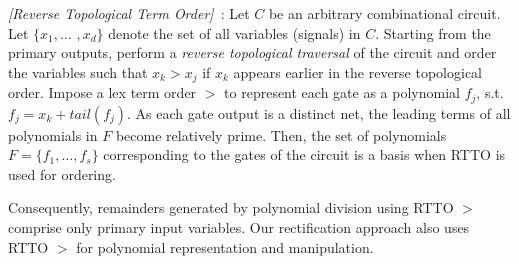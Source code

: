 \begin{Definition}\label{def:rtto}
{\it  [Reverse Topological Term Order]}~\cite{lv:tcad2013}:
Let $C$ be an arbitrary combinational
circuit. Let $\{x_1, \dots$ $, x_d\}$ denote the set of all variables
(signals) in $C$. Starting from the primary outputs, perform
a {\it reverse topological traversal} of the circuit and order the
variables such that $x_k > x_j$ if $x_k$ appears earlier in the
reverse topological order. Impose a lex term order $>$ to represent each
gate as a polynomial $f_j$, s.t. $f_j = x_k + tail(f_j)$. 
As each gate output is a distinct net, the
leading terms of all polynomials in $F$ become relatively prime.
Then, the set of polynomials $F=\{f_1,\dots,f_s\}$ corresponding to the gates of the circuit 
is a \Grobner basis when RTTO is used for ordering.
\end{Definition}

Consequently, remainders 
  generated by polynomial division using RTTO $>$ comprise only primary input variables.
  Our rectification approach also uses RTTO $>$
for polynomial representation and manipulation.





%

